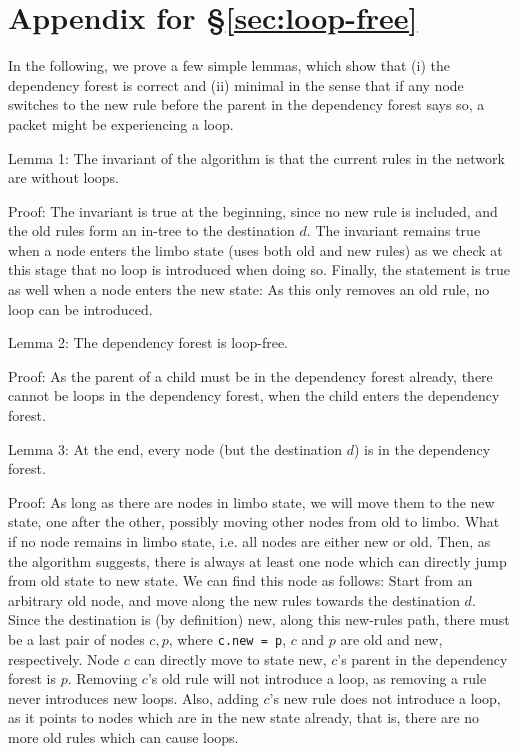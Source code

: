 \section{Appendix for \S\ref{sec:loop-free}} 

In the following, we prove a few simple lemmas, which show that (i) the dependency forest is correct and (ii) minimal in the sense that if any node switches to the new rule before the parent in the dependency forest says so, a packet might be experiencing a loop.

Lemma 1: The invariant of the algorithm is that the current rules in the network are without loops.

Proof: The invariant is true at the beginning, since no new rule is included, and the old rules form an in-tree to the destination $d$. The invariant remains true when a node enters the limbo state (uses both old and new rules) as we check at this stage that no loop is introduced when doing so. Finally, the statement is true as well when a node enters the new state: As this only removes an old rule, no loop can be introduced.

Lemma 2: The dependency forest is loop-free.

Proof: As the parent of a child must be in the dependency forest already, there cannot be loops in the dependency forest, when the child enters the dependency forest.

Lemma 3: At the end, every node (but the destination $d$) is in the dependency forest.

Proof: As long as there are nodes in limbo state, we will move them to the new state, one after the other, possibly moving other nodes from old to limbo. What if no node remains in limbo state, i.e. all nodes are either new or old. Then, as the algorithm suggests, there is always at least one node which can directly jump from old state to new state. We can find this node as follows: Start from an arbitrary old node, and move along the new rules towards the destination $d$. Since the destination is (by definition) new, along this new-rules path, there must be a last pair of nodes $c,p$, where \texttt{c.new = p}, $c$ and $p$ are old and new, respectively. Node $c$ can directly move to state new, $c$'s parent in the dependency forest is $p$. Removing $c$'s old rule will not introduce a loop, as removing a rule never introduces new loops. Also, adding $c$'s new rule does not introduce a loop, as it points to nodes which are in the new state already, that is, there are no more old rules which can cause loops.

